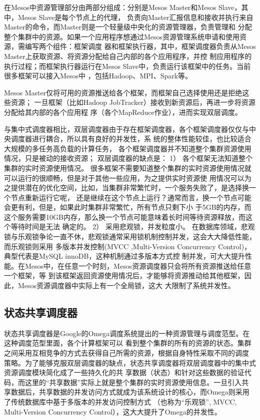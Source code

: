 在Mesos中资源管理部分由两部分组成：分别是Mesos Master和Mesos Slave，其中，Mesos Slave是每个节点上的代理，
负责向Master汇报信息和接收并执行来自Master的命令，而Master则是一个轻量级中央化的资源管理器，负责管理和
分配整个集群中的资源。如果一个应用程序想通过Mesos资源管理系统申请和使用资源，需编写两个组件：框架调度
器和框架执行器，其中，框架调度器负责从Mesos Master上获取资源、将资源分配给自己内部的各个应用程序，并控
制应用程序的执行过程；而框架执行器运行在Mesos Slave中，负责运行该框架中的任务。当前很多框架可以接入Mesos中
，包括Hadoop、MPI、Spark等。

Mesos Master仅将可用的资源推送给各个框架，而框架自己选择使用还是拒绝这些资源；
一旦框架（比如Hadoop JobTracker）接收到新资源后，再进一步将资源分配给其内部的各个应用程
序（各个MapReduce作业），进而实现双层调度。

与集中式调度器相比，双层调度器由于存在框架调度器，各个框架调度器仅仅与中央调度器进行耦合，所以具有良好的并发性，系
统的整体性能较佳，也比较适合大规模的多任务高负载的计算任务，
各个框架调度器并不知道整个集群资源使用情况，只是被动的接收资源；
双层调度器的缺点是：
1）  各个框架无法知道整个集群的实时资源使用情况。
很多框架不需要知道整个集群的实时资源使用情况就可以运行的很顺畅，但是对于其他一些应用，为之提供实时资源使
用情况可以为之提供潜在的优化空间，比如，当集群非常繁忙时，一个服务失败了，是选择换一个节点重新运行它呢，
还是继续在这个节点上运行？通常而言，换一个节点可能会更有利，但是，如果此时集群非常繁忙，所有节点只剩下小
于5GB的内存，而这个服务需要10GB内存，那么换一个节点可能意味着长时间等待资源释放，而这个等待时间是无法
确定的。
2）  采用悲观锁，并发粒度小。
在数据库领域，悲观锁与乐观锁争论一直不休，悲观锁通常采用锁机制控制并发，这会大大降低性能，而乐观锁则采用
多版本并发控制(MVCC ,Multi-Version Concurrency Control)，典型代表是MySQL innoDB，这种机制通过多版本方式控
制并发，可大大提升性能。在Mesos中，在任意一个时刻，Mesos资源调度器只会将所有资源推送给任意一个框架，等
到该框架返回资源使用情况后，才能够将资源推动给其他框架，因此，Mesos资源调度器中实际上有一个全局锁，这大
大限制了系统并发性。
\subsection{状态共享调度器}
 状态共享调度器是Google的Omega调度系统提出的一种资源管理与调度范型。在这种调度范型里面，各个计算框架可以
 看到整个集群的所有的资源的状态。集群之间采用互相竞争的方式去获得自己所需的资源，根据自身特性采取不同的调度
 策略。为了能够克服双层调度器的缺点，状态共享调度器将双层调度器中的集中式资源调度模块简化成了一些持久化的共
 享数据（状态）和针对这些数据的验证代码，而这里的“共享数据”实际上就是整个集群的实时资源使用信息。一旦引入共
 享数据后，共享数据的并发访问方式就成为该系统设计的核心，而Omega则采用了传统数据库中基于多版本的并发访问控制方式
（也称为“乐观锁”, MVCC, Multi-Version Concurrency Control），这大大提升了Omega的并发性。

